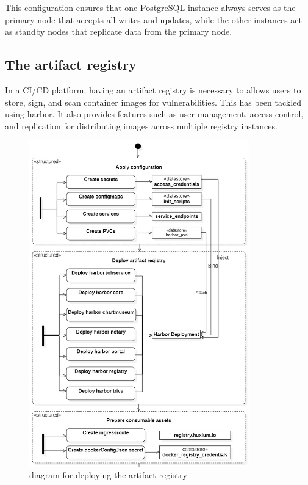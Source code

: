 This configuration ensures that one PostgreSQL instance always serves as the primary node that accepts all writes and updates, while the other instances act as standby nodes that replicate data from the primary node.

\newpage

\subsection{The artifact registry }

In a CI/CD platform, having an artifact registry is necessary to allows users to store, sign, and scan container images for vulnerabilities. This has been tackled using harbor. It also provides features such as user management, access control, and replication for distributing images across multiple registry instances. 

\begin{figure}[H]\centering
\includegraphics[width=0.85\textwidth,angle=00]{assets/f39.png}
\caption{diagram for deploying the artifact registry }
\label{fig:diagram for deploying the artifact registry}
\end{figure}

